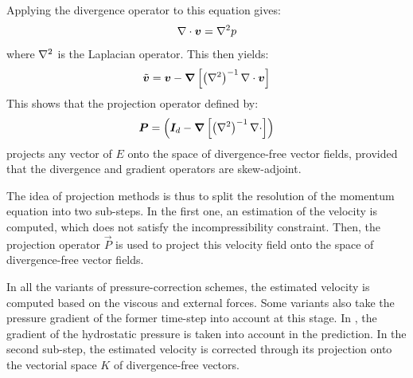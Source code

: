 Applying the divergence operator to this equation gives:
\begin{equation}
  \nabla \cdot \bm{v} = \nabla^2 p
\end{equation}
where $\nabla^2$ is the Laplacian operator. This then yields:
\begin{equation}
  \tilde {\bm{v}} = \bm{v} - \bm{\nabla} \left[\left(\nabla^2 \right)^{-1} \nabla \cdot \bm{v}\right]
\end{equation}
This shows that the projection operator defined by:
\begin{equation}
  \bm{P} = \left(\bm{I}_d-\bm{\nabla} \left[\left(\nabla^2 \right)^{-1} \nabla \cdot \right]\right)
\end{equation}
projects any vector of $E$ onto the space of divergence-free vector fields, provided that the divergence and gradient operators are skew-adjoint.

The idea of projection methods is thus to split the resolution of the momentum equation into two sub-steps.
In the first one, an estimation of the velocity is computed, which does not satisfy the incompressibility constraint.
Then, the projection operator $\vec P$ is used to project this velocity field onto the space of divergence-free vector fields.

In all the variants of pressure-correction schemes, the estimated velocity is computed based on the viscous and external forces.
Some variants also take the pressure gradient of the former time-step into account at this stage.
In , the gradient of the hydrostatic pressure is taken into account in the prediction.
In the second sub-step, the estimated velocity is corrected through its projection onto the vectorial space $K$ of divergence-free vectors.

